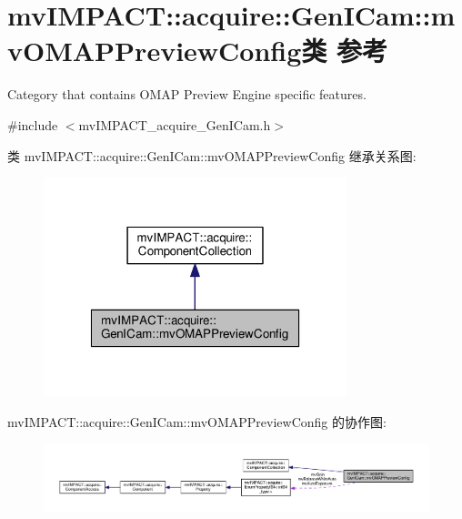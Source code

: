 \hypertarget{classmv_i_m_p_a_c_t_1_1acquire_1_1_gen_i_cam_1_1mv_o_m_a_p_preview_config}{\section{mv\+I\+M\+P\+A\+C\+T\+:\+:acquire\+:\+:Gen\+I\+Cam\+:\+:mv\+O\+M\+A\+P\+Preview\+Config类 参考}
\label{classmv_i_m_p_a_c_t_1_1acquire_1_1_gen_i_cam_1_1mv_o_m_a_p_preview_config}
}


Category that contains O\+M\+A\+P Preview Engine specific features.  




{\ttfamily \#include $<$mv\+I\+M\+P\+A\+C\+T\+\_\+acquire\+\_\+\+Gen\+I\+Cam.\+h$>$}



类 mv\+I\+M\+P\+A\+C\+T\+:\+:acquire\+:\+:Gen\+I\+Cam\+:\+:mv\+O\+M\+A\+P\+Preview\+Config 继承关系图\+:
\nopagebreak
\begin{figure}[H]
\begin{center}
\leavevmode
\includegraphics[width=250pt]{classmv_i_m_p_a_c_t_1_1acquire_1_1_gen_i_cam_1_1mv_o_m_a_p_preview_config__inherit__graph}
\end{center}
\end{figure}


mv\+I\+M\+P\+A\+C\+T\+:\+:acquire\+:\+:Gen\+I\+Cam\+:\+:mv\+O\+M\+A\+P\+Preview\+Config 的协作图\+:
\nopagebreak
\begin{figure}[H]
\begin{center}
\leavevmode
\includegraphics[width=350pt]{classmv_i_m_p_a_c_t_1_1acquire_1_1_gen_i_cam_1_1mv_o_m_a_p_preview_config__coll__graph}
\end{center}
\end{figure}
